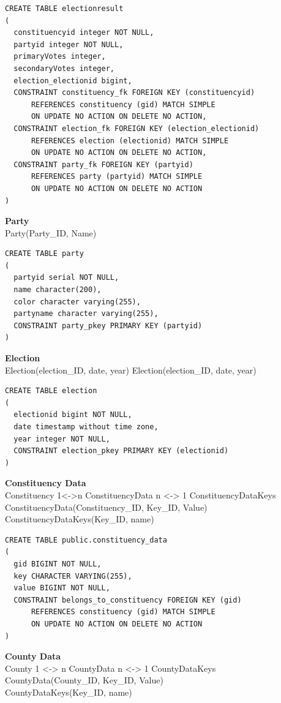 \begin{lstlisting}
CREATE TABLE electionresult
(
  constituencyid integer NOT NULL,
  partyid integer NOT NULL,
  primaryVotes integer,
  secondaryVotes integer,
  election_electionid bigint,
  CONSTRAINT constituency_fk FOREIGN KEY (constituencyid)
      REFERENCES constituency (gid) MATCH SIMPLE
      ON UPDATE NO ACTION ON DELETE NO ACTION,
  CONSTRAINT election_fk FOREIGN KEY (election_electionid)
      REFERENCES election (electionid) MATCH SIMPLE
      ON UPDATE NO ACTION ON DELETE NO ACTION,
  CONSTRAINT party_fk FOREIGN KEY (partyid)
      REFERENCES party (partyid) MATCH SIMPLE
      ON UPDATE NO ACTION ON DELETE NO ACTION
)
\end{lstlisting}

\textbf{Party}
\\Party(Party\_ID, Name)


\begin{lstlisting}
CREATE TABLE party
(
  partyid serial NOT NULL,
  name character(200),
  color character varying(255),
  partyname character varying(255),
  CONSTRAINT party_pkey PRIMARY KEY (partyid)
)
\end{lstlisting}


\textbf{Election}
\\Election(election\_ID, date, year)
Election(election\_ID, date, year)

\begin{lstlisting}
CREATE TABLE election
(
  electionid bigint NOT NULL,
  date timestamp without time zone,
  year integer NOT NULL,
  CONSTRAINT election_pkey PRIMARY KEY (electionid)
)
\end{lstlisting}

\textbf{Constituency Data}
\\Constituency 1\textless{}-\textgreater{}n
ConstituencyData n \textless{}-\textgreater{} 1 ConstituencyDataKeys
ConstituencyData(Constituency\_ID, Key\_ID,
Value)\\ConstituencyDataKeys(Key\_ID, name)



\begin{lstlisting}
CREATE TABLE public.constituency_data
(
  gid BIGINT NOT NULL,
  key CHARACTER VARYING(255),
  value BIGINT NOT NULL,
  CONSTRAINT belongs_to_constituency FOREIGN KEY (gid)
      REFERENCES constituency (gid) MATCH SIMPLE
      ON UPDATE NO ACTION ON DELETE NO ACTION
)
\end{lstlisting}

\textbf{County Data}
\\County 1 \textless{}-\textgreater{} n CountyData n \textless{}-\textgreater{}
1 CountyDataKeys CountyData(County\_ID, Key\_ID, Value)
\\CountyDataKeys(Key\_ID, name)


